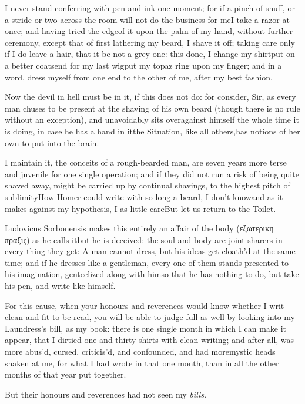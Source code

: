\documentclass{article}
\begin{document}
\tsh I never stand conferring with pen and ink one moment; for if a pinch of snuff,
or a stride or two across the room will not do the business for me\tsk I take a razor
at once; and having tried the edge\pb of it upon the palm of my hand, without
further ceremony, except that of first lathering my beard, I shave it off; taking
care only if I do leave a hair, that it be not a grey one: this done, I change my
shirt\tsk put on a better coat\tsk send for my last wig\tsk put my topaz ring upon my
finger; and in a word, dress myself from one end to the other of me, after my best
fashion.

Now the devil in hell must be in it, if this does not do: for consider, Sir, as
every man chuses to be present at the shaving of his own beard (though there is no
rule without an exception), and unavoidably sits overagainst himself the whole time
it is doing, in case he has a hand in it\tsk the Situation, like all others,\pb has
notions of her own to put into the brain.\tsh

\tsh I maintain it, the conceits of a rough-bearded
man, are seven years more terse and juvenile for one single
operation; and if they did not run a risk of being quite shaved
away, might be carried up by continual shavings, to the highest
pitch of sublimity\tsk How Homer could write with so long
a beard, I don’t know\tsh and as it makes against my
hypothesis, I as little care\tsh But let us return to the
Toilet.

Ludovicus Sorbonensis makes this entirely an affair of the body (εξωτερικη πραξις)
as he calls it\tsh but he is deceived: the soul and body are joint-\pb sharers in
every thing they get: A man cannot dress, but his ideas get cloath’d at the same
time; and if he dresses like a gentleman, every one of them stands presented to his
imagination, genteelized along with him\tsk so that he has nothing to do, but take his
pen, and write like himself.

For this cause, when your honours and reverences would know whether I writ clean and
fit to be read, you will be able to judge full as well by looking into my
Laundress’s bill, as my book: there is one single month in which I can make it
appear, that I dirtied one and thirty shirts with clean writing; and after all, was
more abus’d, cursed, criticis’d, and confounded, and had more\pb mystic heads shaken at
me, for what I had wrote in that one month, than in all the other months of that
year put together.

\tsh But their honours and reverences had not seen my \textit{bills}.
\end{document}
